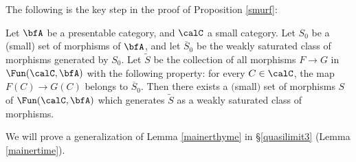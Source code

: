 The following is the key step in the proof of Proposition \ref{smurf}:

\begin{lemma}\label{mainerthyme}
Let $\bfA$ be a presentable category, and $\calC$ a small category. Let $S_0$ be a (small) set of morphisms of $\bfA$, and let $\overline{S}_0$ be the weakly saturated class of morphisms generated by $S_0$. Let $\widetilde{S}$ be the collection of all morphisms $F \rightarrow G$ in $\Fun(\calC, \bfA)$ with the following property: for every $C \in \calC$, the map $F(C) \rightarrow G(C)$ belongs to $\overline{S}_0$. Then there exists a $($small$)$ set of morphisms $S$ of $\Fun(\calC, \bfA)$ which generates $\widetilde{S}$ as a weakly saturated class of morphisms.
\end{lemma}

We will prove a generalization of Lemma \ref{mainerthyme} in \S \ref{quasilimit3}
(Lemma \ref{mainertime}).


